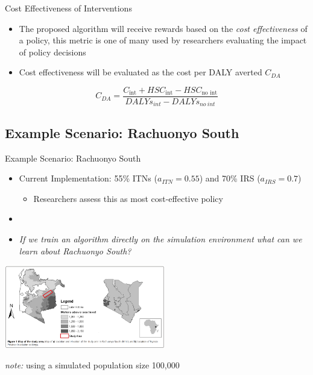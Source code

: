 \documentclass[10pt,usenames,dvipsnames]{beamer}
\begin{document}
\begin{frame}{Cost Effectiveness of Interventions}

\begin{itemize}
\item The proposed algorithm will receive rewards based on the \textit{cost effectiveness} of a policy, this metric is one of many used by researchers evaluating the impact of policy decisions
\item  Cost effectiveness will be evaluated as the cost per DALY averted $C_{DA}$
\end{itemize}

\begin{equation}
C_{DA} =\dfrac{C_{\mbox{int}} + HSC_{\mbox{int}}-HSC_{\mbox{no~int}}}{DALYs_{int}-DALYs_{no~int}} 
\end{equation}


\end{frame}


\subsection{Example Scenario: Rachuonyo South }

\begin{frame}{Example Scenario: Rachuonyo South}

\begin{itemize}
\item Current Implementation: 55\% ITNs ($a_{ITN} = 0.55$) and 70\% IRS ($a_{IRS} = 0.7$) 
	\begin{itemize}
	\item Researchers assess this as most cost-effective policy
	\end{itemize}
\item[ ]
\item \textit{If we train an algorithm directly on the simulation environment what can we learn about Rachuonyo South?}
\end{itemize}
\centering
         \includegraphics[width=7cm]{images/WesternKenya.png} 
         
\textit{note:} using a simulated population size 100,000
\end{frame}
\end{document}
